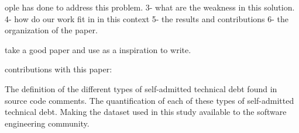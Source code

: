 

ople has done to address this problem. 
3- what are the weakness in this solution. 
4- how do our work fit in in this context
5- the results and contributions 
6- the organization of the paper. 

take a good paper and use as a inspiration to write. 


contributions with this paper:

The definition of the different types of self-admitted technical debt found in source code comments.
The quantification of each of these types of self-admitted technical debt.
Making the dataset used in this study available to the software engineering community.  